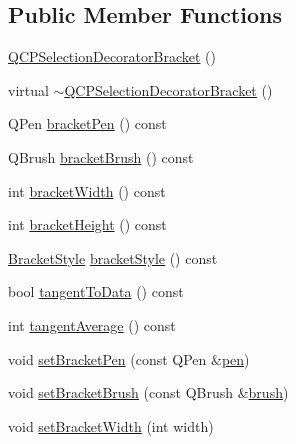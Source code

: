 \subsection*{Public Member Functions}
\begin{DoxyCompactItemize}
\item 
\mbox{\hyperlink{class_q_c_p_selection_decorator_bracket_ad2cfbff98cc055311810ba357f6eef1b}{Q\+C\+P\+Selection\+Decorator\+Bracket}} ()
\item 
virtual \mbox{\hyperlink{class_q_c_p_selection_decorator_bracket_add2764b01a029c64f08f34f08ea6d41b}{$\sim$\+Q\+C\+P\+Selection\+Decorator\+Bracket}} ()
\item 
Q\+Pen \mbox{\hyperlink{class_q_c_p_selection_decorator_bracket_a841c56a37380f2e8af6126881b5f0fb9}{bracket\+Pen}} () const
\item 
Q\+Brush \mbox{\hyperlink{class_q_c_p_selection_decorator_bracket_ac5e409d6b62f0b71143fb8a526fe59a9}{bracket\+Brush}} () const
\item 
int \mbox{\hyperlink{class_q_c_p_selection_decorator_bracket_ae268c621b808d8660d38fc6c69fc40ae}{bracket\+Width}} () const
\item 
int \mbox{\hyperlink{class_q_c_p_selection_decorator_bracket_a531d9c953a7279db93611248e115edab}{bracket\+Height}} () const
\item 
\mbox{\hyperlink{class_q_c_p_selection_decorator_bracket_aa6d18517ec0553575bbef0de4252336e}{Bracket\+Style}} \mbox{\hyperlink{class_q_c_p_selection_decorator_bracket_a1c3d65e560555caf9b31123008491ac6}{bracket\+Style}} () const
\item 
bool \mbox{\hyperlink{class_q_c_p_selection_decorator_bracket_a257cb5f8b822edc839c1510ed0f23f13}{tangent\+To\+Data}} () const
\item 
int \mbox{\hyperlink{class_q_c_p_selection_decorator_bracket_a4e21ee2db0f43c1208d2e30879ec6a3c}{tangent\+Average}} () const
\item 
void \mbox{\hyperlink{class_q_c_p_selection_decorator_bracket_ac0e392a6097990f8aa978932a8fa05d6}{set\+Bracket\+Pen}} (const Q\+Pen \&\mbox{\hyperlink{class_q_c_p_selection_decorator_a9307a60c9759223367909aed2d05ad91}{pen}})
\item 
void \mbox{\hyperlink{class_q_c_p_selection_decorator_bracket_a2f4ea0bfb0ea980252b76dd349dd53aa}{set\+Bracket\+Brush}} (const Q\+Brush \&\mbox{\hyperlink{class_q_c_p_selection_decorator_a783b643aa52120a25308fc501b9998b1}{brush}})
\item 
void \mbox{\hyperlink{class_q_c_p_selection_decorator_bracket_a291b59cab98ce93a0a3c85963fe10f5e}{set\+Bracket\+Width}} (int width)

\end{DoxyCompactItemize}
